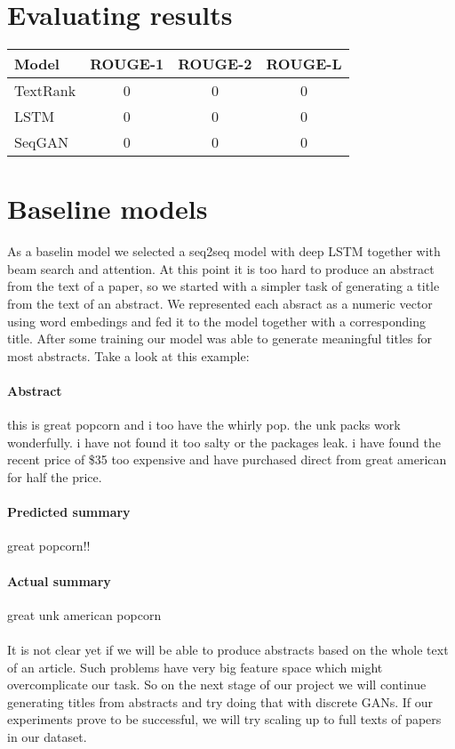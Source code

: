 \documentclass[sigplan]{acmart}
\begin{document}
\section{Evaluating results}

\begin{tabular}{|l|c|c|c|}
\hline
\textbf{Model} & \textbf{ROUGE-1} & \textbf{ROUGE-2} & \textbf{ROUGE-L} \\
\hline
TextRank & 0 & 0 & 0 \\
LSTM & 0 & 0 & 0 \\
SeqGAN & 0 & 0 & 0 \\
\hline
\end{tabular}

\section{Baseline models}

As a baselin model we selected a seq2seq model with deep LSTM\cite{sutskever-17} together with beam search and attention. At this point it is too hard to produce an abstract from the text of a paper, so we started with a simpler task of generating a title from the text of an abstract. We represented each absract as a numeric vector using word embedings and fed it to the model together with a corresponding title. After some training our model was able to generate meaningful titles for most abstracts. Take a look at this example:

\paragraph{Abstract} this is great popcorn and i too have the whirly pop. the unk packs work wonderfully. i have not found it too salty or the packages leak. i have found the recent price of \$35 too expensive and have purchased direct from great american for half the price.

\paragraph{Predicted summary} great popcorn!!

\paragraph{Actual summary} great unk american popcorn

\paragraph{} It is not clear yet if we will be able to produce abstracts based on the whole text of an article. Such problems have very big feature space which might overcomplicate our task. So on the next stage of our project we will continue generating titles from abstracts and try doing that with discrete GANs. If our experiments prove to be successful, we will try scaling up to full texts of papers in our dataset.
\end{document}
